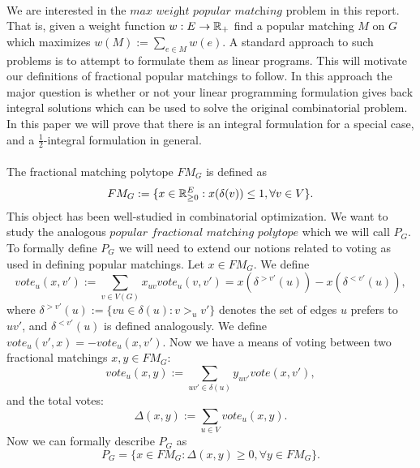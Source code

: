 \documentclass[letterpaper,12pt,oneside,onecolumn]{article}
\begin{document}
\paragraph{}
We are interested in the $\textit{max weight popular matching}$ problem in this report. That is, given a weight function $w: E \rightarrow \mathbb{R}_+$ find a popular matching $M$ on $G$ which maximizes $w(M) := \sum_{e \in M} w(e).$ A standard approach to such problems is to attempt to formulate them as linear programs. This will motivate our definitions of fractional popular matchings to follow. In this approach the major question is whether or not your linear programming formulation gives back integral solutions which can be used to solve the original combinatorial problem. In this paper we will prove that there is an integral formulation for a special case, and a $\frac{1}{2}$-integral formulation in general.
\paragraph{}
The fractional matching polytope $FM_{G}$ is defined as
$$FM_{G} := \{x \in \mathbb{R}_{\geq 0}^{E} : x(\delta(v)) \leq 1, \forall v \in V \}.$$
This object has been well-studied in combinatorial optimization. We want to study the analogous $\textit{popular fractional matching polytope}$ which we will call $P_G$. To formally define $P_G$ we will need to extend our notions related to voting as used in defining popular matchings. Let $x \in FM_G$. We define
$$vote_u(x, v') := \sum_{v \in V(G)} x_{uv} vote_u(v,v') = x(\delta^{>v'}(u)) - x(\delta^{<v'}(u)),$$
where $\delta^{>v'}(u) := \{vu \in \delta(u) : v >_u v'\}$ denotes the set of edges $u$ prefers to $uv'$, and $\delta^{<v'}(u)$ is defined analogously.  We define $vote_u(v',x) = -vote_u(x,v')$. Now we have a means of voting between two fractional matchings $x,y \in FM_G$:
$$vote_u(x,y) := \sum_{uv' \in \delta(u)} y_{uv'}vote(x,v'), $$
and the total votes:
$$\Delta(x,y) := \sum_{u \in V} vote_u(x,y).$$
Now we can formally describe $P_G$ as 
$$P_G = \{ x\in FM_G: \Delta(x,y) \geq 0, \forall y \in FM_G\}.$$
\end{document}
